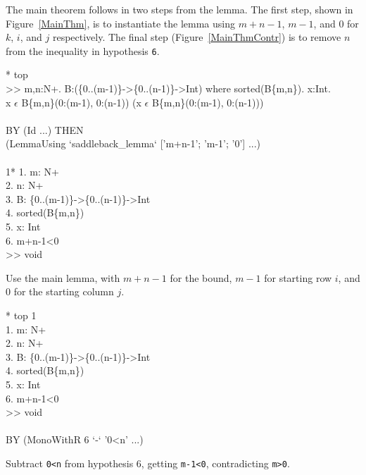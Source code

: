 The main theorem follows in two steps from the lemma.  The first step, shown in
Figure~\ref{MainThm}, is to instantiate the lemma using $m+n-1$, $m-1$, and $0$
for $k$, $i$, and $j$ respectively.  The final step (Figure~\ref{MainThmContr})
is to remove $n$ from the inequality in hypothesis {\tt 6}.
\begin{RuledFigure}
\begin{Screen}{1}{\SnapshotSize}
\N{}* top  \\{}
\N{}>> \mforall{}m,n:N+. \mforall{}B:(\{0..(m-1)\}->\{0..(n-1)\}->Int) %
where sorted(B\{m,n\}). \mforall{}x:Int. \\{}
\N{}      x \(\epsilon{}\) B\{m,n\}(0:(m-1), 0:(n-1))  %
\mvee{}  \mneg{}(x \(\epsilon{}\) B\{m,n\}(0:(m-1), 0:(n-1))) \\{}
\N{} \\{}
\N{}BY (Id ...) THEN  \\{}
\N{}   (LemmaUsing `saddleback\_lemma` ['m+n-1'; 'm-1'; '0'] ...) \\{}
\N{} \\{}
\N{}1* 1. m: N+ \\{}
\N{}   2. n: N+ \\{}
\N{}   3. B: \{0..(m-1)\}->\{0..(n-1)\}->Int \\{}
\N{}   4. sorted(B\{m,n\}) \\{}
\N{}   5. x: Int \\{}
\N{}   6. m+n-1<0 \\{}
\N{}   >> void    
\end{Screen}%
\caption{Use the main lemma, with $m+n-1$ for the bound, $m-1$ for starting 
row $i$, and $0$ for the starting column $j$.}
\label{MainThm} 
\end{RuledFigure}
\begin{RuledFigure}
\begin{Screen}{1}{\SnapshotSize}
\N{}* top 1 \\{}
\N{}1. m: N+ \\{}
\N{}2. n: N+ \\{}
\N{}3. B: \{0..(m-1)\}->\{0..(n-1)\}->Int \\{}
\N{}4. sorted(B\{m,n\}) \\{}
\N{}5. x: Int \\{}
\N{}6. m+n-1<0 \\{}
\N{}>> void \\{}
\N{} \\{}
\N{}BY (MonoWithR 6 `-` '0<n' ...) 
\end{Screen}%
\caption{Subtract {\tt 0<n} from hypothesis 6, getting {\tt m-1<0},
contradicting {\tt m>0}.} 
\label{MainThmContr} 
\end{RuledFigure}

